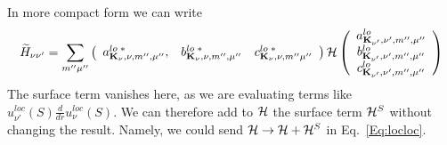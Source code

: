 \documentclass[aps,prb,floatfix,epsfig,singlecolumn,showpacs,preprintnumbers]{revtex4}
\newcommand{\vK}{{\mathbf{K}}}
\newcommand{\cH}{{\cal H}}
\begin{document}
% 
In more compact form we can write
\begin{eqnarray}
\widetilde{H}_{\nu\nu'}=\sum_{m''\mu''} 
\left(
\begin{array}{ccc}
a^{lo\;*}_{\vK_\nu,\nu,m'',\mu''}, & b^{lo\;*}_{\vK_\nu,\nu,m'',\mu''} & c^{lo\;*}_{\vK_\nu,\nu,m''\mu''}
\end{array}
\right)
\cH
\left(
\begin{array}{c}
a^{lo}_{\vK_{\nu'},\nu',m'',\mu''}\\
b^{lo}_{\vK_{\nu'},\nu',m'',\mu''}\\ 
c^{lo}_{\vK_{\nu'},\nu',m'',\mu''}
\end{array}
\right)
\label{Eq:locloc}
\end{eqnarray}
The surface term vanishes here, as we are evaluating terms like
$u^{loc}_{\nu'}(S)\frac{d}{dr} u^{loc}_{\nu}(S)$. 
We can therefore add to $\cH$ the surface term $\cH^S$ without
changing the result. Namely, we could send $\cH\rightarrow\cH+\cH^S$
in Eq.~\ref{Eq:locloc}.
\end{document}
